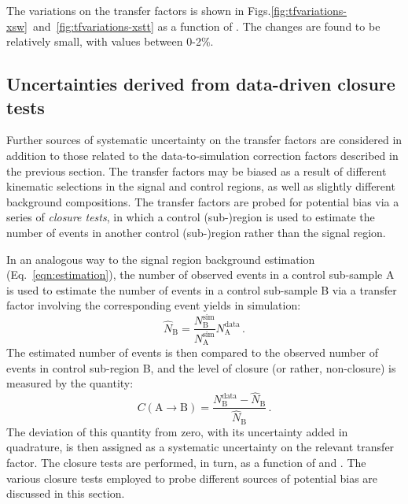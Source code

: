The variations on the \Tmutottw transfer factors is shown in 
Figs.\ref{fig:tfvariations-xsw}~and~\ref{fig:tfvariations-xstt} as a function 
of \njnbht. The changes are found to be relatively small, with values between 
0-2\%.


\subsection{Uncertainties derived from data-driven closure tests}
\label{sec:analysis-systematics-data}
Further sources of systematic uncertainty on the transfer factors are 
considered in addition to those related to the data-to-simulation correction 
factors described in the previous section. The transfer factors may be biased 
as a result of different kinematic selections in the signal and control 
regions, as well as slightly different background compositions. The transfer 
factors are probed for potential bias via a series of \textit{closure tests}, 
in which a control (sub-)region is used to estimate the number of events in 
another control (sub-)region rather than the signal region.

In an analogous way to the signal region background estimation 
(Eq.~\ref{eqn:estimation}), the number of observed events in a control 
sub-sample A is used to estimate the number of events in a control sub-sample 
B via a transfer factor involving the corresponding event yields in simulation:
\begin{equation}
\label{eqn:closuretest}
\hat{N}_\mathrm{B} = 
\frac{N_\mathrm{B}^\mathrm{sim}}{N_\mathrm{A}^\mathrm{sim}}
N_\mathrm{A}^\mathrm{data} \, .
\end{equation}
The estimated number of events is then compared to the observed number of 
events in control sub-region B, and the level 
of closure (or rather, non-closure) is measured by the quantity:
\begin{equation}
C(\mathrm{A}\rightarrow\mathrm{B}) = \frac{N_\mathrm{B}^\mathrm{data} - 
\hat{N}_\mathrm{B}}{\hat{N}_\mathrm{B}} \, .
\end{equation}
The deviation of this quantity from zero, with its uncertainty added in 
quadrature, is then assigned as a systematic uncertainty on the relevant 
transfer factor. The closure tests are performed, in turn, as a function of 
\scalht and \njet. The various closure tests employed to probe different 
sources of potential bias are discussed in this section.

